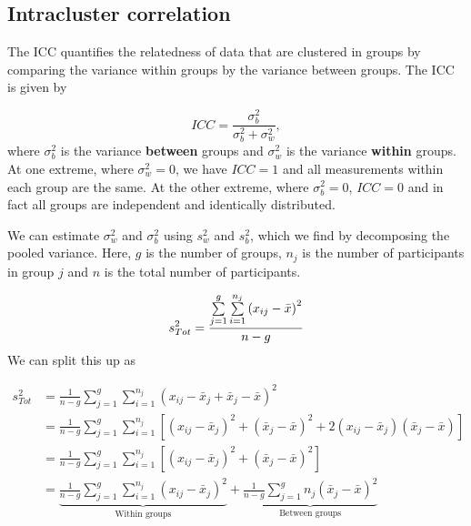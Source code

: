 \documentclass[
  openany]{book}
\theoremstyle{definition}
\theoremstyle{definition}
\theoremstyle{definition}
\theoremstyle{definition}
\theoremstyle{remark}
\begin{document}
\hypertarget{intracluster-correlation}{%
\subsection{Intracluster correlation}\label{intracluster-correlation}}

The ICC quantifies the relatedness of data that are clustered in groups by comparing the variance within groups by the variance between groups. The ICC is given by

\[ICC = \frac{\sigma^2_b}{\sigma^2_b + \sigma^2_w}, \]
where \(\sigma^2_b\) is the variance \textbf{between} groups and \(\sigma^2_w\) is the variance \textbf{within} groups. At one extreme, where \(\sigma_w^2=0\), we have \(ICC=1\) and all measurements within each group are the same. At the other extreme, where \(\sigma^2_b=0\), \(ICC=0\) and in fact all groups are independent and identically distributed.

We can estimate \(\sigma_w^2\) and \(\sigma_b^2\) using \(s_w^2\) and \(s_b^2\), which we find by decomposing the pooled variance. Here, \(g\) is the number of groups, \(n_j\) is the number of participants in group \(j\) and \(n\) is the total number of participants.

\[
s^2_{Tot} =  \frac{\sum\limits_{j=1}^g \sum\limits_{i=1}^{n_j}\left(x_{ij}-\bar{x}\right)^2}{n-g}\\
\]
We can split this up as

\[
\begin{aligned}
s^2_{Tot} & = \frac{1}{n-g}\sum\limits_{j=1}^g \sum\limits_{i=1}^{n_j}\left(x_{ij} - \bar{x}_j + \bar{x}_j-\bar{x}\right)^2\\
& = \frac{1}{n-g}\sum\limits_{j=1}^g \sum\limits_{i=1}^{n_j}\left[\left(x_{ij} - \bar{x}_j\right)^2 + \left(\bar{x}_j-\bar{x}\right)^2 + 2\left(x_{ij} - \bar{x}_j\right)\left(\bar{x}_j-\bar{x}\right)\right]\\
& = \frac{1}{n-g}\sum\limits_{j=1}^g \sum\limits_{i=1}^{n_j}\left[\left(x_{ij} - \bar{x}_j\right)^2 + \left(\bar{x}_j-\bar{x}\right)^2 \right]\\
&= \underbrace{\frac{1}{n-g}\sum\limits_{j=1}^g \sum\limits_{i=1}^{n_j}\left(x_{ij} - \bar{x}_j\right)^2}_{\text{Within groups}} + \underbrace{\frac{1}{n-g}\sum\limits_{j=1}^g n_j\left(\bar{x}_j - \bar{x}\right)^2}_{\text{Between groups}}
\end{aligned}
\]
\end{document}
